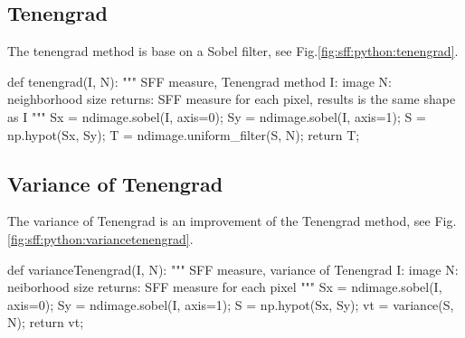 \vspace*{-15pt}

\subsection{Tenengrad}
The tenengrad method is base on a Sobel filter, see Fig.\ref{fig:sff:python:tenengrad}.

\begin{python}
def tenengrad(I, N):
    """
    SFF measure, Tenengrad method
    I: image
    N: neighborhood size
    returns: SFF measure for each pixel, results is the same shape as I
    """
    Sx = ndimage.sobel(I, axis=0);
    Sy = ndimage.sobel(I, axis=1);
    S = np.hypot(Sx, Sy);
    T = ndimage.uniform_filter(S, N);
    return T;
\end{python}

\vspace*{-3pt}

\subsection{Variance of Tenengrad}
The variance of Tenengrad is an improvement of the Tenengrad method, see Fig.\ref{fig:sff:python:variancetenengrad}.

\begin{python}
def varianceTenengrad(I, N):
    """
    SFF measure, variance of Tenengrad
    I: image
    N: neiborhood size
    returns: SFF measure for each pixel
    """
    Sx = ndimage.sobel(I, axis=0);
    Sy = ndimage.sobel(I, axis=1);
    S = np.hypot(Sx, Sy);
    vt = variance(S, N);
    return vt;
\end{python}

